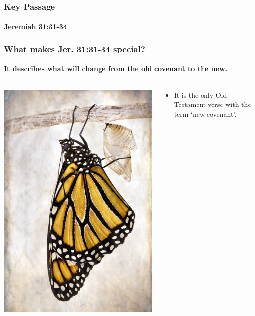 \begin{frame}
\frametitle{Key Passage}
\framesubtitle{Jeremiah 31:31-34}
\keyverse
\end{frame}

\begin{frame}
\frametitle{What makes Jer. 31:31-34 special?}
\framesubtitle{It describes what will change from the old covenant to the new.}
\begin{columns}
\begin{column}{0.4\textwidth}
\includegraphics[width=\columnwidth]{figures/metamorphosis.jpg}
\end{column}
\begin{column}{0.6\textwidth}
\begin{itemize}
\item It is the only Old Testament verse with the term `new covenant'.

\end{itemize}
\end{column}
\end{columns}
\end{frame}
